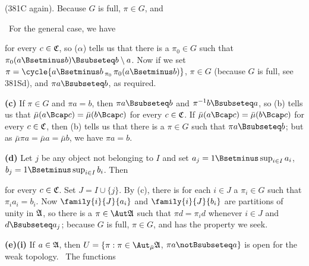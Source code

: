 {\noindent(381C again).   Because $G$ is full, $\pi\in G$, and


\medskip

\qquad\grheadb\ For the general case, we have


\noindent for every $c\in\frak C$,
so ($\alpha$) tells us that there is a $\pi_0\in G$ such that
$\pi_0(a\Bsetminus b)\Bsubseteq b\setminus a$.   Now if we set
$\pi=\cycle{a\Bsetminus b\,_{\pi_0}\,\pi_0(a\Bsetminus b)}$,
$\pi\in G$ (because $G$ is full, see 381Sd), and $\pi a\Bsubseteq b$,
as required.

\medskip

{\bf (c)} If $\pi\in G$ and $\pi a=b$, then
$\pi a\Bsubseteq b$ and $\pi^{-1}b\Bsubseteq a$, so (b) tells us that
$\bar\mu(a\Bcap c)=\bar\mu(b\Bcap c)$ for every $c\in\frak C$.
If $\bar\mu(a\Bcap c)=\bar\mu(b\Bcap c)$ for every $c\in\frak C$,
then (b) tells us that there is a $\pi\in G$ such that
$\pi a\Bsubseteq b$;  but as $\bar\mu\pi a=\bar\mu a=\bar\mu b$,
we have $\pi a=b$.

\medskip

{\bf (d)} Let $j$ be any object not belonging to $I$ and set
$a_j=1\Bsetminus\sup_{i\in I}a_i$, $b_j=1\Bsetminus\sup_{i\in I}b_i$.
Then


\noindent for every $c\in\frak C$.   Set $J=I\cup\{j\}$.
By (c), there is for each
$i\in J$ a $\pi_i\in G$ such that $\pi_ia_i=b_i$.
Now $\family{i}{J}{a_i}$ and
$\family{i}{J}{b_i}$ are partitions of unity in $\frak A$, so there is a
$\pi\in\Aut\frak A$ such that $\pi d=\pi_id$ whenever $i\in J$ and
$d\Bsubseteq a_j$;  because $G$ is full, $\pi\in G$, and has the property
we seek.

\medskip

{\bf (e)(i)} If $a\in\frak A$, then
$U=\{\pi:\pi\in\AmuA$, $\pi a\notBsubseteq a\}$ is
open for the weak topology.   \Prf\ The functions


}
